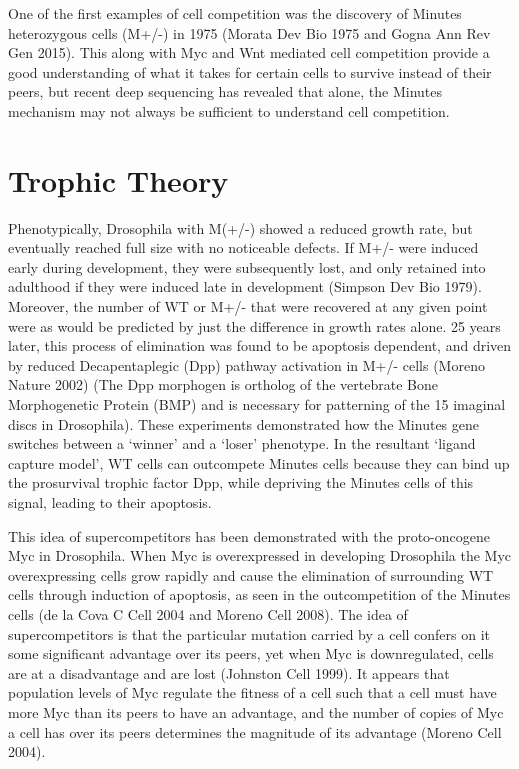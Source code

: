 \documentclass[]{book}
\begin{document}
One of the first examples of cell competition was the discovery of Minutes heterozygous cells (M+/-) in 1975 (Morata Dev Bio 1975 and Gogna Ann Rev Gen 2015). This along with Myc and Wnt mediated cell competition provide a good understanding of what it takes for certain cells to survive instead of their peers, but recent deep sequencing has revealed that alone, the Minutes mechanism may not always be sufficient to understand cell competition.

\hypertarget{trophic-theory}{%
\section{Trophic Theory}\label{trophic-theory}}

Phenotypically, Drosophila with M(+/-) showed a reduced growth rate, but eventually reached full size with no noticeable defects. If M+/- were induced early during development, they were subsequently lost, and only retained into adulthood if they were induced late in development (Simpson Dev Bio 1979). Moreover, the number of WT or M+/- that were recovered at any given point were as would be predicted by just the difference in growth rates alone. 25 years later, this process of elimination was found to be apoptosis dependent, and driven by reduced Decapentaplegic (Dpp) pathway activation in M+/- cells (Moreno Nature 2002) (The Dpp morphogen is ortholog of the vertebrate Bone Morphogenetic Protein (BMP) and is necessary for patterning of the 15 imaginal discs in Drosophila). These experiments demonstrated how the Minutes gene switches between a `winner' and a `loser' phenotype. In the resultant `ligand capture model', WT cells can outcompete Minutes cells because they can bind up the prosurvival trophic factor Dpp, while depriving the Minutes cells of this signal, leading to their apoptosis.

This idea of supercompetitors has been demonstrated with the proto-oncogene Myc in Drosophila. When Myc is overexpressed in developing Drosophila the Myc overexpressing cells grow rapidly and cause the elimination of surrounding WT cells through induction of apoptosis, as seen in the outcompetition of the Minutes cells (de la Cova C Cell 2004 and Moreno Cell 2008). The idea of supercompetitors is that the particular mutation carried by a cell confers on it some significant advantage over its peers, yet when Myc is downregulated, cells are at a disadvantage and are lost (Johnston Cell 1999). It appears that population levels of Myc regulate the fitness of a cell such that a cell must have more Myc than its peers to have an advantage, and the number of copies of Myc a cell has over its peers determines the magnitude of its advantage (Moreno Cell 2004).
\end{document}
